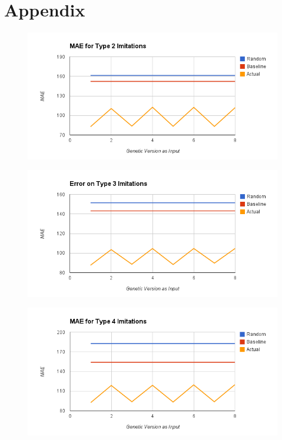 \section{Appendix}
%

\clearpage
\begin{figure}[center]
	\centering
	\includegraphics[width=16cm]{images/error_type_2_imitations.png}
	\caption{}
	\label{fig:c2}
\end{figure}
\begin{figure}[center]
	\centering
	\includegraphics[width=16cm]{images/error_type_3_imitations.png}
	\caption{}
	\label{fig:c3}
\end{figure}
\begin{figure}[center]
	\centering
	\includegraphics[width=16cm]{images/error_type_4_imitations.png}
	\caption{}
	\label{fig:c4}
\end{figure}
